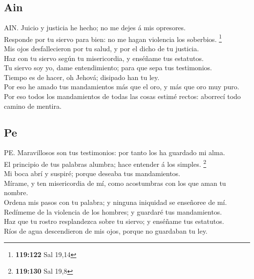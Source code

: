 \hypertarget{ain}{%
\subsection{Ain}\label{ain}}

 AIN. Juicio y justicia he hecho; no me dejes á mis
opresores.\\
 Responde por tu siervo para bien: no me hagan violencia
los soberbios. \footnote{\textbf{119:122} Sal 19,14}\\
 Mis ojos desfallecieron por tu salud, y por el dicho de
tu justicia.\\
 Haz con tu siervo según tu misericordia, y enséñame tus
estatutos.\\
 Tu siervo soy yo, dame entendimiento; para que sepa tus
testimonios.\\
 Tiempo es de hacer, oh Jehová; disipado han tu ley.\\
 Por eso he amado tus mandamientos más que el oro, y más
que oro muy puro.\\
 Por eso todos los mandamientos de todas las cosas
estimé rectos: aborrecí todo camino de mentira.

\hypertarget{pe}{%
\subsection{Pe}\label{pe}}

 PE. Maravillosos son tus testimonios: por tanto los ha
guardado mi alma.\\
 El principio de tus palabras alumbra; hace entender á
los simples. \footnote{\textbf{119:130} Sal 19,8}\\
 Mi boca abrí y suspiré; porque deseaba tus
mandamientos.\\
 Mírame, y ten misericordia de mí, como acostumbras con
los que aman tu nombre.\\
 Ordena mis pasos con tu palabra; y ninguna iniquidad se
enseñoree de mí.\\
 Redímeme de la violencia de los hombres; y guardaré tus
mandamientos.\\
 Haz que tu rostro resplandezca sobre tu siervo; y
enséñame tus estatutos.\\
 Ríos de agua descendieron de mis ojos, porque no
guardaban tu ley.

